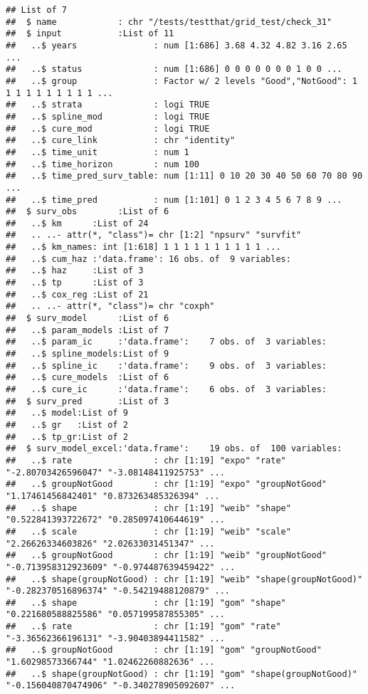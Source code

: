 \documentclass[
]{article}
\begin{document}
\begin{verbatim}
## List of 7
##  $ name            : chr "/tests/testthat/grid_test/check_31"
##  $ input           :List of 11
##   ..$ years               : num [1:686] 3.68 4.32 4.82 3.16 2.65 ...
##   ..$ status              : num [1:686] 0 0 0 0 0 0 0 1 0 0 ...
##   ..$ group               : Factor w/ 2 levels "Good","NotGood": 1 1 1 1 1 1 1 1 1 1 ...
##   ..$ strata              : logi TRUE
##   ..$ spline_mod          : logi TRUE
##   ..$ cure_mod            : logi TRUE
##   ..$ cure_link           : chr "identity"
##   ..$ time_unit           : num 1
##   ..$ time_horizon        : num 100
##   ..$ time_pred_surv_table: num [1:11] 0 10 20 30 40 50 60 70 80 90 ...
##   ..$ time_pred           : num [1:101] 0 1 2 3 4 5 6 7 8 9 ...
##  $ surv_obs        :List of 6
##   ..$ km      :List of 24
##   .. ..- attr(*, "class")= chr [1:2] "npsurv" "survfit"
##   ..$ km_names: int [1:618] 1 1 1 1 1 1 1 1 1 1 ...
##   ..$ cum_haz :'data.frame': 16 obs. of  9 variables:
##   ..$ haz     :List of 3
##   ..$ tp      :List of 3
##   ..$ cox_reg :List of 21
##   .. ..- attr(*, "class")= chr "coxph"
##  $ surv_model      :List of 6
##   ..$ param_models :List of 7
##   ..$ param_ic     :'data.frame':    7 obs. of  3 variables:
##   ..$ spline_models:List of 9
##   ..$ spline_ic    :'data.frame':    9 obs. of  3 variables:
##   ..$ cure_models  :List of 6
##   ..$ cure_ic      :'data.frame':    6 obs. of  3 variables:
##  $ surv_pred       :List of 3
##   ..$ model:List of 9
##   ..$ gr   :List of 2
##   ..$ tp_gr:List of 2
##  $ surv_model_excel:'data.frame':    19 obs. of  100 variables:
##   ..$ rate                : chr [1:19] "expo" "rate" "-2.80703426596047" "-3.08148411925753" ...
##   ..$ groupNotGood        : chr [1:19] "expo" "groupNotGood" "1.17461456842401" "0.873263485326394" ...
##   ..$ shape               : chr [1:19] "weib" "shape" "0.522841393722672" "0.285097410644619" ...
##   ..$ scale               : chr [1:19] "weib" "scale" "2.26626334603826" "2.02633031451347" ...
##   ..$ groupNotGood        : chr [1:19] "weib" "groupNotGood" "-0.713958312923609" "-0.974487639459422" ...
##   ..$ shape(groupNotGood) : chr [1:19] "weib" "shape(groupNotGood)" "-0.282370516896374" "-0.54219488120879" ...
##   ..$ shape               : chr [1:19] "gom" "shape" "0.221680588825586" "0.057199587855305" ...
##   ..$ rate                : chr [1:19] "gom" "rate" "-3.36562366196131" "-3.90403894411582" ...
##   ..$ groupNotGood        : chr [1:19] "gom" "groupNotGood" "1.60298573366744" "1.02462260882636" ...
##   ..$ shape(groupNotGood) : chr [1:19] "gom" "shape(groupNotGood)" "-0.156040870474906" "-0.340278905092607" ...

\end{verbatim}
\end{document}
